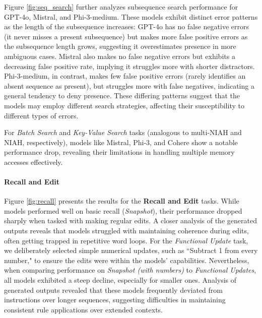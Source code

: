 

Figure \ref{fig:seq_search} further analyzes subsequence search performance for GPT-4o, Mistral, and Phi-3-medium. These models exhibit distinct error patterns as the length of the subsequence increases: GPT-4o has no false negative errors (it never misses a present subsequence) but makes more false positive errors as the subsequence length grows, suggesting it overestimates presence in more ambiguous cases.
Mistral also makes no false negative errors but exhibits a decreasing false positive rate, implying it struggles more with shorter distractors. Phi-3-medium, in contrast, makes few false positive errors (rarely identifies an absent sequence as present), but struggles more with false negatives, indicating a general tendency to deny presence. These differing patterns suggest that the models may employ different search strategies, affecting their susceptibility to different types of errors.

For \textit{Batch Search} and \textit{Key-Value Search} tasks (analogous to multi-NIAH and NIAH, respectively), models like Mistral, Phi-3, and Cohere show a notable performance drop, revealing their limitations in handling multiple memory accesses effectively.


\paragraph{Recall and Edit} 


Figure \ref{fig:recall} presents the results for the \textbf{Recall and Edit} tasks. While models performed well on basic recall (\textit{Snapshot}), their performance dropped sharply when tasked with making regular edits. A closer analysis of the generated outputs reveals that models struggled with maintaining coherence during edits, often getting trapped in repetitive word loops. For the \textit{Functional Update} task, we deliberately selected simple numerical updates, such as ``Subtract 1 from every number," to ensure the edits were within the models' capabilities. Nevertheless, when comparing performance on \textit{Snapshot (with numbers)} to \textit{Functional Updates}, all models exhibited a steep decline, especially for smaller ones. Analysis of generated outputs revealed that these models frequently deviated from instructions over longer sequences, suggesting difficulties in maintaining consistent rule applications over extended contexts.

